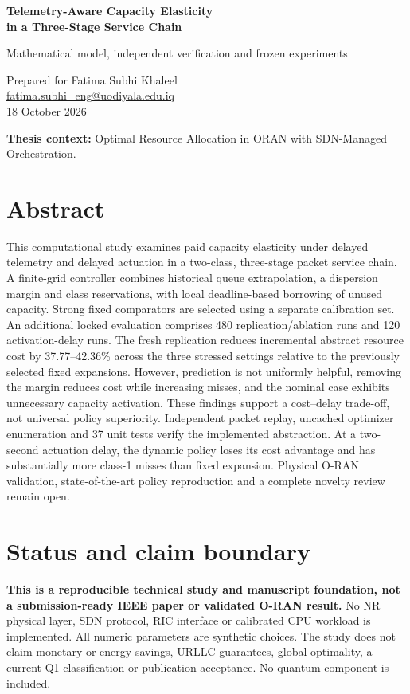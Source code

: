 \documentclass[10pt,a4paper]{article}
\begin{document}
{\Large\bfseries Telemetry-Aware Capacity Elasticity\\in a Three-Stage Service Chain}\par
{\large Mathematical model, independent verification and frozen experiments}\par
Prepared for Fatima Subhi Khaleel\\
\href{mailto:fatima.subhi_eng@uodiyala.edu.iq}{fatima.subhi\_eng@uodiyala.edu.iq}\\
18 October 2026

\textbf{Thesis context:} Optimal Resource Allocation in ORAN with SDN-Managed Orchestration.

\section*{Abstract}
This computational study examines paid capacity elasticity under delayed telemetry
and delayed actuation in a two-class, three-stage packet service chain. A finite-grid
controller combines historical queue extrapolation, a dispersion margin and class
reservations, with local deadline-based borrowing of unused capacity. Strong fixed
comparators are selected using a separate calibration set. An additional locked
evaluation comprises 480 replication/ablation runs and 120 activation-delay runs.
The fresh replication reduces incremental abstract resource cost by
37.77--42.36\% across the three stressed settings relative to the previously selected
fixed expansions. However, prediction is not uniformly helpful, removing the margin
reduces cost while increasing misses, and the nominal case exhibits unnecessary
capacity activation. These findings support a cost--delay trade-off, not universal
policy superiority. Independent packet replay, uncached optimizer enumeration and
37 unit tests verify the implemented abstraction. At a two-second actuation delay,
the dynamic policy loses its cost advantage and has substantially more class-1
misses than fixed expansion. Physical O-RAN validation,
state-of-the-art policy reproduction and a complete novelty review remain open.

\section*{Status and claim boundary}
\textbf{This is a reproducible technical study and manuscript foundation, not a
submission-ready IEEE paper or validated O-RAN result.} No NR physical layer, SDN
protocol, RIC interface or calibrated CPU workload is implemented. All numeric
parameters are synthetic choices. The study does not claim monetary or energy
savings, URLLC guarantees, global optimality, a current Q1 classification or
publication acceptance. No quantum component is included.
\end{document}

